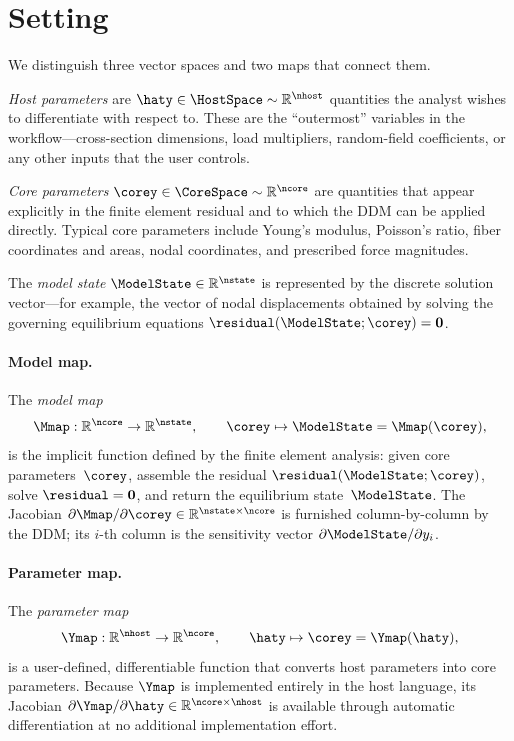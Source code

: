 


\section{Setting}
\label{sec:setting}


We distinguish three vector spaces and two maps that connect them.

\emph{Host parameters}
are $\haty \in \HostSpace\sim\mathbb{R}^{\nhost}$ quantities the analyst
wishes to differentiate with respect to.  
These are the ``outermost''
variables in the workflow---cross-section dimensions, load
multipliers, random-field coefficients, or any other inputs that the
user controls.

\emph{Core parameters} 
 $\corey \in \CoreSpace\sim\mathbb{R}^{\ncore}$ are quantities that
appear explicitly in the finite element residual and to which the DDM
can be applied directly.  
Typical core parameters include Young's
modulus, Poisson's ratio, fiber coordinates and areas, nodal
coordinates, and prescribed force magnitudes.

The \emph{model state} $\ModelState \in \mathbb{R}^{\nstate}$ is represented by the discrete solution
vector---for example, the vector of nodal displacements obtained by
solving the governing equilibrium equations
$\residual(\ModelState;\corey)=\mathbf{0}$.

\paragraph{Model map.}
The \emph{model map}
\begin{equation}\label{eq:Mmap}
    \Mmap : \mathbb{R}^{\ncore} \to \mathbb{R}^{\nstate},
    \qquad \corey \mapsto \ModelState = \Mmap(\corey),
\end{equation}
is the implicit function defined by the finite element analysis: given
core parameters~$\corey$, assemble the residual
$\residual(\ModelState;\corey)$, solve $\residual = \mathbf{0}$, and return
the equilibrium state~$\ModelState$.  The Jacobian
$\partial\Mmap/\partial\corey \in \mathbb{R}^{\nstate\times\ncore}$
is furnished column-by-column by the DDM; its $i$-th column is the
sensitivity vector $\partial\ModelState/\partial y_i$.

\paragraph{Parameter map.}
The \emph{parameter map}
\begin{equation}\label{eq:Ymap}
    \Ymap : \mathbb{R}^{\nhost} \to \mathbb{R}^{\ncore},
    \qquad \haty \mapsto \corey = \Ymap(\haty),
\end{equation}
is a user-defined, differentiable function that converts host
parameters into core parameters.  Because $\Ymap$ is implemented
entirely in the host language, its Jacobian
$\partial\Ymap/\partial\haty \in \mathbb{R}^{\ncore\times\nhost}$ is
available through automatic differentiation at no additional
implementation effort.


